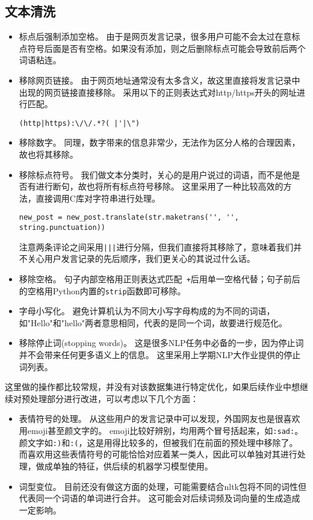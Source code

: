 \documentclass[logo,reportComp]{thesis}
\begin{document}
\subsection{文本清洗}
\begin{itemize}
	\item 标点后强制添加空格。
	由于是网页发言记录，很多用户可能不会太过在意标点符号后面是否有空格。如果没有添加，则之后删除标点可能会导致前后两个词语粘连。
	\item 移除网页链接。
	由于网页地址通常没有太多含义，故这里直接将发言记录中出现的网页链接直接移除。
	采用以下的正则表达式对http/https开头的网址进行匹配。
\begin{lstlisting}
(http|https):\/\/.*?( |'|\")
\end{lstlisting}
	\item 移除数字。
	同理，数字带来的信息非常少，无法作为区分人格的合理因素，故也将其移除。
	\item 移除标点符号。
	我们做文本分类时，关心的是用户说过的词语，而不是他是否有进行断句，故也将所有标点符号移除。
	这里采用了一种比较高效的方法，直接调用C库对字符串进行处理。
\begin{lstlisting}
new_post = new_post.translate(str.maketrans('', '', string.punctuation))
\end{lstlisting}
	注意两条评论之间采用\verb'|||'进行分隔，但我们直接将其移除了，意味着我们并不关心用户发言记录的先后顺序，我们更关心的其说过什么话。
	\item 移除空格。
	句子内部空格用正则表达式匹配\verb' +'后用单一空格代替；句子前后的空格用Python内置的\verb'strip'函数即可移除。
	\item 字母小写化。
	避免计算机认为不同大小写字母构成的为不同的词语，如"Hello"和"hello"两者意思相同，代表的是同一个词，故要进行规范化。
	\item 移除停止词(stopping words)。
	这是很多NLP任务中必备的一步，因为停止词并不会带来任何更多语义上的信息。
	这里采用上学期NLP大作业提供的停止词列表\cite{bib:stopping_words}。
\end{itemize}

这里做的操作都比较常规，并没有对该数据集进行特定优化，如果后续作业中想继续对预处理部分进行改进，可以考虑以下几个方面：
\begin{itemize}
	\item 表情符号的处理。
	从这些用户的发言记录中可以发现，外国网友也是很喜欢用emoji甚至颜文字的。
	emoji比较好辨别，均用两个冒号括起来，如\verb':sad:'。
	颜文字如\verb':)'和\verb':('，这是用得比较多的，但被我们在前面的预处理中移除了。
	而喜欢用这些表情符号的可能恰恰对应着某一类人，因此可以单独对其进行处理，做成单独的特征，供后续的机器学习模型使用。
	\item 词型变位。
	目前还没有做这方面的处理，可能需要结合nltk包将不同的词性但代表同一个词语的单词进行合并。
	这可能会对后续词频及词向量的生成造成一定影响。
\end{itemize}
\end{document}
